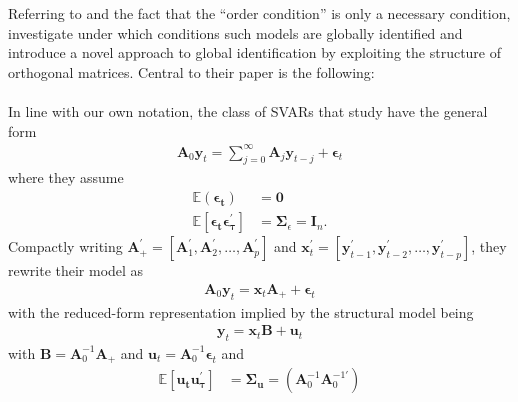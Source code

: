 \documentclass[a4paper,11pt,listof=nochaptergap,oneside,pointednumbers,bibtotoc,bigheadings,liststotoc]{scrbook}
\theoremstyle{mysatz}
\theoremstyle{mydefinition}
\theoremstyle{mybemerkung}
\newcommand{\vect}[1]{\boldsymbol{\mathbf{#1}}}
\begin{document}
Referring to \citet{rothenberg:71} and the fact that the ``order condition'' is only a necessary condition, \citet{rubioetal:10} investigate under which conditions such models are globally identified and introduce a novel approach to global identification by exploiting the structure of orthogonal matrices. Central to their paper is the following: \\
\\
In line with our own notation, the class of SVARs that \citet{rubioetal:10} study have the general form
\begin{equation} \label{eq:svar_1}
\begin{split}
	\vect{A}_0 \vect{y}_t = \sum\limits_{j=0}^\infty \vect{A}_j\vect{y}_{t-j} + \vect{\epsilon}_t
\end{split}								
\end{equation}
where they assume 
\begin{equation}\label{eq:svar_2}
\begin{split}
	\mathbb{E}(\vect{\epsilon_t}) &  = \vect{0}  \\
	\mathbb{E}[\vect{\epsilon_t}\vect{\epsilon_{\tau}^'}] & = \vect{\Sigma}_\epsilon = \vect{I}_n.
\end{split}								
\end{equation}
Compactly writing $\vect{A}_{+}^' = [\vect{A}_1^', \vect{A}_2^', \dots, \vect{A}_p^']$ and $\vect{x}_{t}^' = [\vect{y}_{t-1}^', \vect{y}_{t-2}^', \dots, \vect{y}_{t-p}^']$, they rewrite their model as
\begin{equation}\label{eq:svar_3}
\begin{split}
	\vect{A}_0 \vect{y}_t =  \vect{x}_t \vect{A}_+ + \vect{\epsilon}_t
\end{split}								
\end{equation}
with the reduced-form representation implied by the structural model being
\begin{equation}\label{eq:svar_4}
\begin{split}
	 \vect{y}_t =  \vect{x}_t \vect{B} + \vect{u}_t
\end{split}								
\end{equation}
with $\vect{B} = \vect{A}_0^{-1}\vect{A}_+$ and $\vect{u}_t = \vect{A}_0^{-1}\vect{\epsilon}_t$ and
	\begin{equation} \label{eq:svar_5}
	\begin{split}
		\mathbb{E}[\vect{u_t}\vect{u_{\tau}^'}] & = 
      												\vect{\Sigma_u} = (\vect{A}_0^{-1}\vect{A}_0^{-1'})
	\end{split}								
	\end{equation}	
\end{document}
